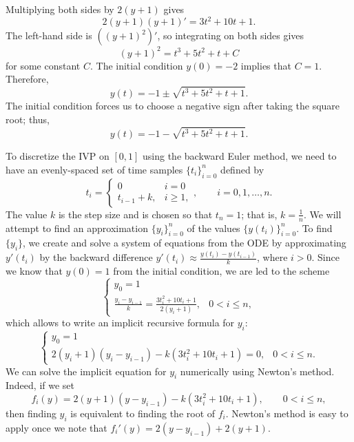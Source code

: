 \documentclass{homework}
\begin{document}
	\begin{arabicparts}
		\questionpart Multiplying both sides by $2(y+1)$ gives
		\begin{equation}
			2(y+1)(y+1)' = 3t^2+10t+1.
		\end{equation}
		The left-hand side is $\left((y+1)^2\right)'$, so integrating on both sides gives
		\begin{equation}
			(y+1)^2 = t^3+5t^2+t+C
		\end{equation}
		for some constant $C$. The initial condition $y(0) = -2$ implies that $C = 1$. Therefore,
		\begin{equation}
			y(t) = -1 \pm \sqrt{t^3+5t^2+t+1}.
		\end{equation}
		The initial condition forces us to choose a negative sign after taking the square root; thus,
		\begin{equation}
			y(t) = -1 - \sqrt{t^3+5t^2+t+1}.
		\end{equation}
		
		\questionpart To discretize the IVP on $[0,1]$ using the backward Euler method, we need to have an evenly-spaced set of time samples $\{t_i\}_{i=0}^n$ defined by
		\begin{equation}
			t_i = \begin{cases}
				0 & i = 0 \\
				t_{i-1} + k, & i \ge 1,
			\end{cases}, \qquad i = 0,1,\dots,n.
		\end{equation}
		The value $k$ is the step size and is chosen so that $t_n = 1$; that is, $k = \frac{1}{n}$. We will attempt to find an approximation $\{y_i\}_{i=0}^n$ of the values $\{y(t_i)\}_{i=0}^n$. To find $\{y_i\}$, we create and solve a system of equations from the ODE by approximating $y'(t_i)$ by the backward difference $y'(t_i) \approx \frac{y(t_i) - y(t_{i-1})}{k}$, where $i > 0$. Since we know that $y(0) = 1$ from the initial condition, we are led to the scheme
		\begin{equation}
			\begin{cases}
				y_0 = 1 &\\
				\frac{y_i - y_{i-1}}{k} = \frac{3t_i^2+10t_i + 1}{2(y_i + 1)}, & 0 < i \le n,
			\end{cases}
		\end{equation}
		which allows to write an implicit recursive formula for $y_i$:
		\begin{equation}
			\begin{cases}
				y_0 = 1 &\\
				2(y_i+1)(y_i-y_{i-1}) - k(3t_i^2+10t_i+1) = 0, & 0 < i \le n.
			\end{cases}
		\end{equation}
		We can solve the implicit equation for $y_i$ numerically using Newton's method. Indeed, if we set
		\begin{equation}
			f_i(y) = 2(y+1)(y-y_{i-1}) - k(3t_i^2+10t_i+1), \qquad 0 < i\le n,
		\end{equation}
		then finding $y_i$ is equivalent to finding the root of $f_i$. Newton's method is easy to apply once we note that $f_i'(y) = 2(y-y_{i-1}) + 2(y+1)$.
	\end{arabicparts}
\end{document}
